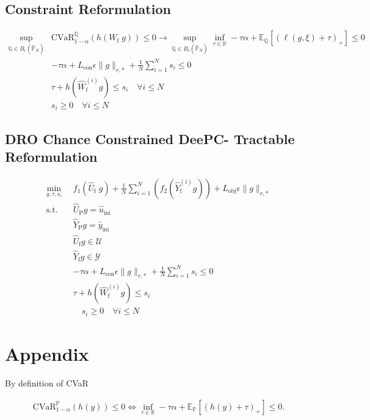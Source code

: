 \documentclass[12pt, a4paper]{article}
\begin{document}
\subsection{Constraint Reformulation}
\begin{align}
    \sup_{\mathbb{Q} \in B_\epsilon(\hat{\mathbb{P}}_N)} & \text{CVaR}_{1-\alpha}^{\mathbb{Q}}(h(W_\text{f}\;g)) \leq 0 \rightarrow\sup_{\mathbb{Q} \in B_\epsilon(\hat{\mathbb{P}}_N)} \inf_{\tau \in \mathbb{R}} -\tau\alpha + \mathbb{E}_\mathbb{Q}[(\ell(g,\xi) + \tau)_+] \leq 0 \\[0.5cm]
    &-\tau\alpha + L_\text{con}\epsilon\|g\|_{r,*} + \frac{1}{N}\sum_{i=1}^N s_i \leq 0 \\
    &\tau + h(\hat{W}_\text{f}^{(i)}g) \leq s_i \quad \forall i \leq N \\
    &s_i \geq 0 \quad \forall i \leq N
\end{align}



\subsection{DRO Chance Constrained DeePC- Tractable Reformulation}

\begin{align}
    \min_{g,\tau,s_i} & f_1(\hat{U}_\text{f}\;g)  + \frac{1}{N}\sum_{i=1}^N \left(f_2(\hat{Y}_\text{f}^{(i)}g)\right) + L_\text{obj}\epsilon\|g\|_{r,*} \\
     \text{s.t.} \quad & \hat{U}_\text{P}g = \hat{u}_\text{ini} \\
     & \hat{Y}_\text{P}g = \hat{y}_\text{ini} \\
     & \hat{U}_\text{f}g \in \mathcal{U} \\
     & \hat{Y}_\text{f}g \in \mathcal{Y} \\
     & -\tau\alpha + L_\text{con}\epsilon\|g\|_{r,*} + \frac{1}{N}\sum_{i=1}^N s_i \leq 0 \\
     & \tau + h(\hat{W}_\text{f}^{(i)}g) \leq s_i \quad \\
     & \quad s_i \geq 0 \quad \forall i \leq N
\end{align}


\newpage

\section*{Appendix}

By definition of CVaR

\begin{align}
    \text{CVaR}_{1-\alpha}^{\mathbb{P}}(h(y)) \leq 0 \Longleftrightarrow \inf_{\tau \in \mathbb{R}} -\tau\alpha + \mathbb{E}_\mathbb{P}[(h(y) + \tau)_+] \leq 0.
\end{align}
\end{document}
